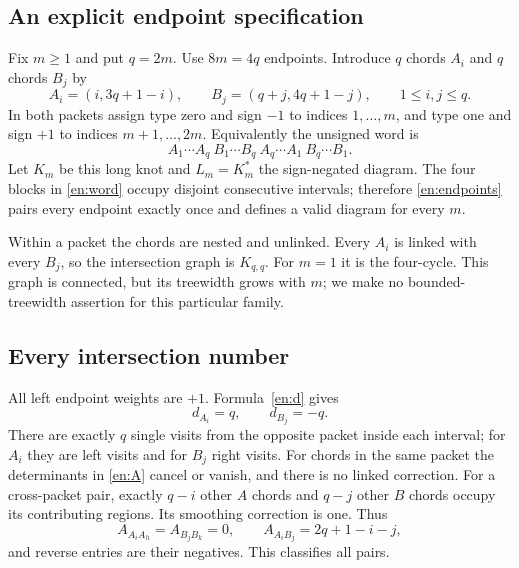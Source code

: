 \documentclass[12pt]{amsart}
\theoremstyle{definition}
\theoremstyle{remark}
\numberwithin{equation}{section}
\begin{document}
\subsection{An explicit endpoint specification}
Fix $m\ge1$ and put $q=2m$. Use $8m=4q$ endpoints. Introduce $q$ chords
$A_i$ and $q$ chords $B_j$ by
\begin{equation}\label{en:endpoints}
A_i=(i,3q+1-i),\qquad B_j=(q+j,4q+1-j),\qquad 1\le i,j\le q.
\end{equation}
In both packets assign type zero and sign $-1$ to indices $1,\ldots,m$,
and type one and sign $+1$ to indices $m+1,\ldots,2m$.
Equivalently the unsigned word is
\begin{equation}\label{en:word}
A_1\cdots A_q\ B_1\cdots B_q\ A_q\cdots A_1\ B_q\cdots B_1.
\end{equation}
Let $K_m$ be this long knot and $L_m=K_m^*$ the sign-negated diagram.
The four blocks in \eqref{en:word} occupy disjoint consecutive intervals;
therefore \eqref{en:endpoints} pairs every endpoint exactly once and
defines a valid diagram for every $m$.

Within a packet the chords are nested and unlinked. Every $A_i$ is linked
with every $B_j$, so the intersection graph is $K_{q,q}$. For $m=1$ it is
the four-cycle. This graph is connected, but its treewidth grows with $m$;
we make no bounded-treewidth assertion for this particular family.

\subsection{Every intersection number}
All left endpoint weights are $+1$. Formula~\eqref{en:d} gives
\begin{equation}\label{en:familyd}
d_{A_i}=q,\qquad d_{B_j}=-q.
\end{equation}
There are exactly $q$ single visits from the opposite packet inside each
interval; for $A_i$ they are left visits and for $B_j$ right visits.
For chords in the same packet the determinants in \eqref{en:A} cancel
or vanish, and there is no linked correction. For a cross-packet pair,
exactly $q-i$ other $A$ chords and $q-j$ other $B$ chords occupy its
contributing regions. Its smoothing correction is one. Thus
\begin{equation}\label{en:familyA}
A_{A_iA_h}=A_{B_jB_k}=0,\qquad
A_{A_iB_j}=2q+1-i-j,
\end{equation}
and reverse entries are their negatives. This classifies all pairs.
\end{document}
